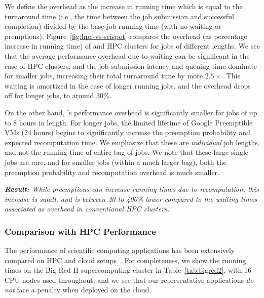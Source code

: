 We define the overhead as the increase in running time which is equal to the turnaround time (i.e., the time between the job submission and successful completion) divided by the base job running time (with no waiting or premptions). 
Figure~\ref{fig:hpc-vs-scispot} compares the overhead (as percentage increase in running time) of \sysname and HPC clusters  for jobs of different lengths. We see that the average performance overhead due to waiting can be significant in the case of HPC clusters, and the job submission latency and queuing time dominate for smaller jobs, increasing their total turnaround time by more $2.5\times$.
This waiting is amortized in the case of longer running jobs, and the overhead drops off for longer jobs, to around 30\%.

On the other hand, \sysname's performance overhead is significantly smaller for jobs of up to 8 hours in length.
For longer jobs, the limited lifetime of Google Preemptible VMs (24 hours) begins to significantly increase the preemption probability and expected recomputation time.
We emphasize that these are \emph{individual} job lengths, and not the running time of entire bag of jobs.
We note that these large single jobs are rare, and for smaller jobs (within a much larger bag), both the preemption probability and recomputation overhead is much smaller. 

\noindent \emph{ \textbf{Result:} While preemptions can increase running times due to recomputation, this increase is small, and is between 20 to 400\% lower compared to the waiting times associated as overhead in conventional HPC clusters. }

\subsubsection{Comparison with HPC Performance}
The performance of scientific computing applications has been extensively compared on HPC and cloud setups~\cite{iosup_performance_2011, zhai_cloud_2011, marathe2013comparative, galante_analysis_2016, benedictis_cloud-aware_2014}. 
For completeness, we show the running times on the Big Red II supercomputing cluster in Table~\ref{tab:bigred2}, with 16 CPU nodes used throughout, and we see that our representative applications \emph{do not} face a penalty when deployed on the cloud. 



